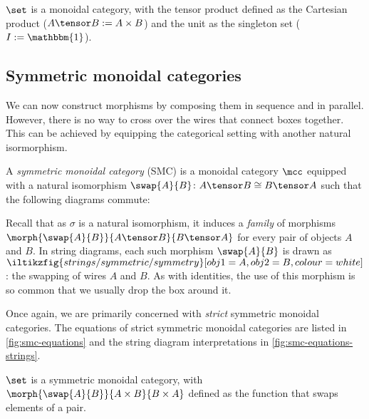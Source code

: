 


\begin{example}
    \(\set\) is a monoidal category, with the tensor product defined as the
    Cartesian product (\(A \tensor B := A \times B\)) and the unit as the
    singleton set (\(I := \mathbbm{1}\)).
\end{example}

\subsection{Symmetric monoidal categories}

We can now construct morphisms by composing them in sequence and in parallel.
However, there is no way to cross over the wires that connect boxes together.
This can be achieved by equipping the categorical setting with another natural
isormorphism.

\begin{definition}
    \label{def:symmetric-monoidal-category}
    A \emph{symmetric monoidal category} (SMC) is a monoidal category \(\mcc\)
    equipped with a natural isomorphism \(
        \swap{A}{B} \colon A \tensor B \cong B \tensor A
    \) such that the following diagrams commute:
    \begin{center}
        
        

        \vspace{1em}

        
    \end{center}
\end{definition}

Recall that as \(\sigma\) is a natural isomorphism, it induces
a \emph{family} of morphisms \(
    \morph{\swap{A}{B}}{A \tensor B}{B \tensor A}
\) for every pair of objects \(A\) and \(B\).
In string diagrams, each such morphism \(\swap{A}{B}\) is drawn as \(
    \iltikzfig{strings/symmetric/symmetry}[obj1=A, obj2=B, colour=white]
\): the swapping of wires \(A\) and \(B\).
As with identities, the use of this morphism is so common that we usually
drop the box around it.

Once again, we are primarily concerned with \emph{strict} symmetric
monoidal categories.
The equations of strict symmetric monoidal categories are listed in
\cref{fig:smc-equations} and the string diagram interpretations in
\cref{fig:smc-equations-strings}.






\begin{example}
    \(\set\) is a symmetric monoidal category, with \(
        \morph{\swap{A}{B}}{A \times B}{B \times A}
    \) defined as the function that swaps elements of a pair.
\end{example}